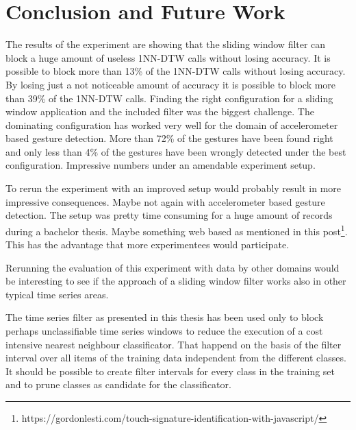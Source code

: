 \section{Conclusion and Future Work} \label{conclusion_and_future_work}
The results of the experiment are showing that the sliding window filter can block a huge amount of useless 1NN-DTW
calls without losing accuracy. It is possible to block more than 13\% of the 1NN-DTW calls without losing accuracy. By
losing just a not noticeable amount of accuracy it is possible to block more than 39\% of the 1NN-DTW calls. Finding the
right configuration for a sliding window application and the included filter was the biggest challenge. The dominating
configuration has worked very well for the domain of accelerometer based gesture detection. More than 72\% of the
gestures have been found right and only less than 4\% of the gestures have been wrongly detected under the best
configuration. Impressive numbers under an amendable experiment setup.

To rerun the experiment with an improved setup would probably result in more impressive consequences. Maybe not again
with accelerometer based gesture detection. The setup was pretty time consuming for a huge amount of records during a
bachelor thesis. Maybe something web based as mentioned in this
post\footnote{https://gordonlesti.com/touch-signature-identification-with-javascript/}. This has the advantage that more
experimentees would participate.

Rerunning the evaluation of this experiment with data by other domains would be interesting to see if the approach of a
sliding window filter works also in other typical time series areas.

The time series filter as presented in this thesis has been used only to block perhaps unclassifiable time series
windows to reduce the execution of a cost intensive nearest neighbour classificator. That happend on the basis of the
filter interval over all items of the training data independent from the different classes. It should be possible to
create filter intervals for every class in the training set and to prune classes as candidate for the classificator.
